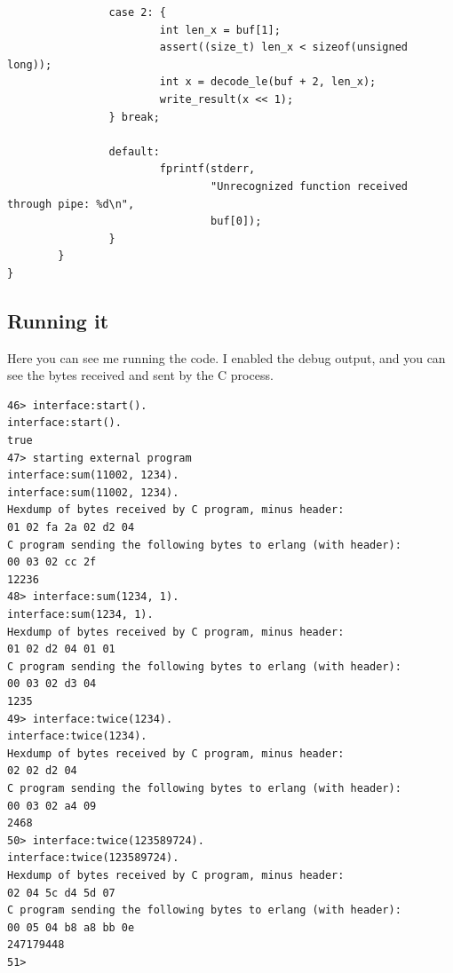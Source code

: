 \documentclass[11pt]{article}
\begin{document}
\begin{verbatim}
                case 2: {
                        int len_x = buf[1];
                        assert((size_t) len_x < sizeof(unsigned long));
                        int x = decode_le(buf + 2, len_x);
                        write_result(x << 1);
                } break;

                default:
                        fprintf(stderr,
                                "Unrecognized function received through pipe: %d\n",
                                buf[0]);
                }
        }
}
\end{verbatim}

\subsection{Running it}
\label{sec:org9723912}
Here you can see me running the code. I enabled the debug output,
and you can see the bytes received and sent by the C process.

\begin{verbatim}
46> interface:start().
interface:start().
true
47> starting external program
interface:sum(11002, 1234).
interface:sum(11002, 1234).
Hexdump of bytes received by C program, minus header:
01 02 fa 2a 02 d2 04 
C program sending the following bytes to erlang (with header):
00 03 02 cc 2f 
12236
48> interface:sum(1234, 1).
interface:sum(1234, 1).
Hexdump of bytes received by C program, minus header:
01 02 d2 04 01 01 
C program sending the following bytes to erlang (with header):
00 03 02 d3 04 
1235
49> interface:twice(1234).
interface:twice(1234).
Hexdump of bytes received by C program, minus header:
02 02 d2 04 
C program sending the following bytes to erlang (with header):
00 03 02 a4 09 
2468
50> interface:twice(123589724).
interface:twice(123589724).
Hexdump of bytes received by C program, minus header:
02 04 5c d4 5d 07 
C program sending the following bytes to erlang (with header):
00 05 04 b8 a8 bb 0e 
247179448
51> 
\end{verbatim}
\end{document}
